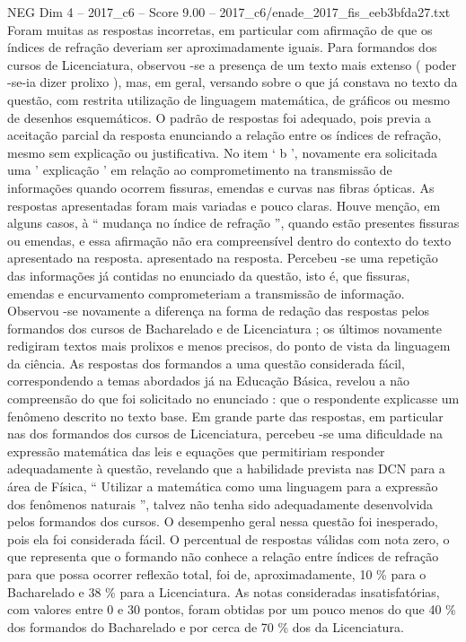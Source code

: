 \begin{textsample}{NEG Dim 4 – 2017\_c6 – Score 9.00 – 2017\_c6/enade\_2017\_fis\_eeb3bfda27.txt}
Foram muitas as respostas incorretas, em particular com afirmação de que os índices de refração deveriam ser aproximadamente iguais.
Para formandos dos cursos de Licenciatura, observou -se a presença de um texto mais extenso ( poder -se-ia dizer prolixo ), mas, em geral, versando sobre o que já constava no texto da questão, com restrita utilização de linguagem matemática, de gráficos ou mesmo de desenhos esquemáticos.
O padrão de respostas foi adequado, pois previa a aceitação parcial da resposta enunciando a relação entre os índices de refração, mesmo sem explicação ou justificativa.
No item ‘ b ’, novamente era solicitada uma ' explicação ' em relação ao comprometimento na transmissão de informações quando ocorrem fissuras, emendas e curvas nas fibras ópticas.
As respostas apresentadas foram mais variadas e pouco claras.
Houve menção, em alguns casos, à “ mudança no índice de refração ”, quando estão presentes fissuras ou emendas, e essa afirmação não era compreensível dentro do contexto do texto apresentado na resposta. apresentado na resposta.
Percebeu -se uma repetição das informações já contidas no enunciado da questão, isto é, que fissuras, emendas e encurvamento comprometeriam a transmissão de informação.
Observou -se novamente a diferença na forma de redação das respostas pelos formandos dos cursos de Bacharelado e de Licenciatura ; os últimos novamente redigiram textos mais prolixos e menos precisos, do ponto de vista da linguagem da ciência.
As respostas dos formandos a uma questão considerada fácil, correspondendo a temas abordados já na Educação Básica, revelou a não compreensão do que foi solicitado no enunciado : que o respondente explicasse um fenômeno descrito no texto base.
Em grande parte das respostas, em particular nas dos formandos dos cursos de Licenciatura, percebeu -se uma dificuldade na expressão matemática das leis e equações que permitiriam responder adequadamente à questão, revelando que a habilidade prevista nas DCN para a área de Física, “ Utilizar a matemática como uma linguagem para a expressão dos fenômenos naturais ”, talvez não tenha sido adequadamente desenvolvida pelos formandos dos cursos.
O desempenho geral nessa questão foi inesperado, pois ela foi considerada fácil.
O percentual de respostas válidas com nota zero, o que representa que o formando não conhece a relação entre índices de refração para que possa ocorrer reflexão total, foi de, aproximadamente, 10 \% para o Bacharelado e 38 \% para a Licenciatura.
As notas consideradas insatisfatórias, com valores entre 0 e 30 pontos, foram obtidas por um pouco menos do que 40 \% dos formandos do Bacharelado e por cerca de 70 \% dos da Licenciatura.

\end{textsample}
